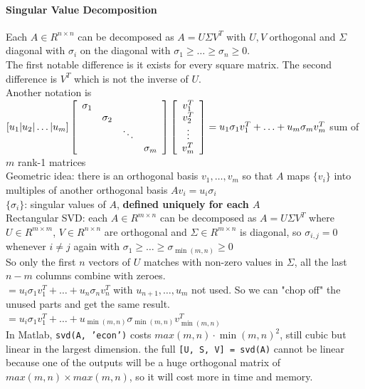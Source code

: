 \documentclass[10pt]{report}
\begin{document}
\paragraph{Singular Value Decomposition} Each $A\in R^{n\times n}$ can be decomposed as $A = U\Sigma V^T$ with $U, V$ orthogonal and $\Sigma$ diagonal with $\sigma_i$ on the diagonal with $\sigma_1 \geq \ldots \geq \sigma_n \geq 0$.\\
The first notable difference is it exists for every square matrix. The second difference is $V^T$ which is not the inverse of $U$.\\
Another notation is $[u_1|u_2|\ldots|u_m]\left[\begin{array}{c c c c}
\sigma_1\\ & \sigma_2\\ & & \ddots\\ & & & \sigma_m
\end{array} \right]\left[\begin{array}{c}
v_1^T\\v_2^T\\\vdots\\v_m^T
\end{array} \right] = u_1\sigma_1 v_1^T + \ldots + u_m\sigma_m v_m^T$ sum of $m$ rank-1 matrices\\
Geometric idea: there is an orthogonal basis $v_1,\ldots, v_m$ so that $A$ maps $\{v_i\}$ into multiples of another orthogonal basis $A v_i = u_i \sigma_i$\\
$\{\sigma_i\}$: singular values of $A$, \textbf{defined uniquely for each $A$}\\
Rectangular SVD: each $A\in R^{m\times n}$ can be decomposed as $A = U\Sigma V^T$ where $U\in R^{m\times m}$, $V \in R^{n\times n}$ are orthogonal and $\Sigma\in R^{m\times n}$ is diagonal, so $\sigma_{i,j} = 0$ whenever $i\neq j$ again with $\sigma_1 \geq \ldots \geq \sigma_{\min(m, n)} \geq 0$\\
So only the first $n$ vectors of $U$ matches with non-zero values in $\Sigma$, all the last $n-m$ columns combine with zeroes.\\
$= u_i\sigma_1 v_1^T + \ldots + u_n \sigma_n v_n^T$ with $u_{n+1},\ldots, u_m$ not used. So we can "chop off" the unused parts and get the same result.\\
$= u_i\sigma_1 v_1^T + \ldots + u_{\min(m, n)} \sigma_{\min(m, n)} v_{\min(m, n)}^T$\\
In Matlab, \texttt{svd(A, 'econ')} costs $max(m,n)\cdot \min(m,n)^2$, still cubic but linear in the largest dimension. the full \texttt{[U, S, V] = svd(A)} cannot be linear because one of the outputs will be a huge orthogonal matrix of $max(m,n)\times max(m,n)$, so it will cost more in time and memory.\\\\
\end{document}
